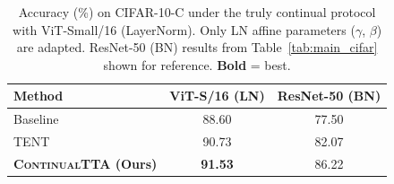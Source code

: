 \begin{table}[t]
\centering
\caption{Accuracy (\%) on CIFAR-10-C under the truly continual protocol with ViT-Small/16 (LayerNorm). Only LN affine parameters ($\gamma$, $\beta$) are adapted. ResNet-50 (BN) results from Table~\ref{tab:main_cifar} shown for reference. \textbf{Bold} = best.}
\label{tab:vit}
\begin{tabular}{lcc}
\toprule
Method & ViT-S/16 (LN) & ResNet-50 (BN) \\
\midrule
Baseline & 88.60 & 77.50 \\
TENT~\cite{wang2021tent} & 90.73 & 82.07 \\
\textbf{\textsc{ContinualTTA} (Ours)} & \textbf{91.53} & 86.22 \\
\bottomrule
\end{tabular}
\end{table}